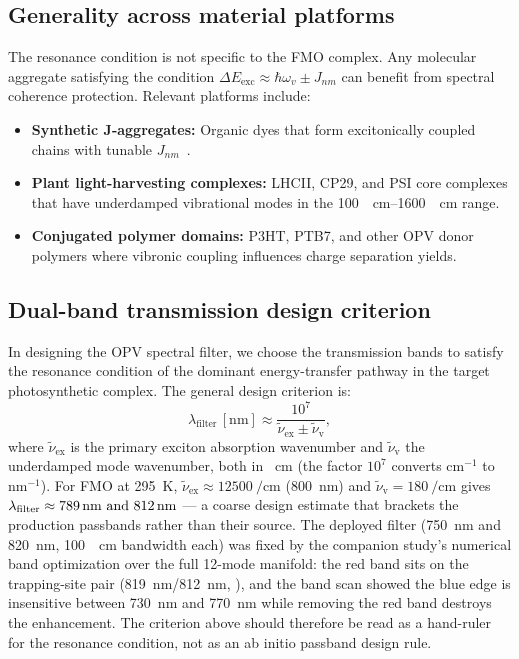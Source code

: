 \documentclass[11pt,a4paper]{article}
\begin{document}
\subsection{Generality across material platforms}

The resonance condition is not specific to the FMO complex. Any molecular aggregate satisfying the condition $\Delta E_{\mathrm{exc}} \approx \hbar\omega_v \pm J_{nm}$ can benefit from spectral coherence protection.
Relevant platforms include:
\begin{itemize}
\item \textbf{Synthetic J-aggregates:} Organic dyes that form excitonically coupled chains with tunable $J_{nm}$~\cite{Jang2008}.
\item \textbf{Plant light-harvesting complexes:} LHCII, CP29, and PSI core complexes that have underdamped vibrational modes in the \qtyrange{100}{1600}{\per\cm} range.
\item \textbf{Conjugated polymer domains:} P3HT, PTB7, and other OPV donor polymers where vibronic coupling influences charge separation yields.
\end{itemize}

\subsection{Dual-band transmission design criterion}

In designing the OPV spectral filter, we choose the transmission bands to satisfy the resonance condition of the dominant energy-transfer pathway in the target photosynthetic complex. The general design criterion is:
\begin{equation}\label{eq:SI_filter_design}
\lambda_{\mathrm{filter}}\,[\mathrm{nm}] \approx \frac{10^{7}}{\tilde\nu_{\mathrm{ex}} \pm \tilde\nu_{\mathrm{v}}},
\end{equation}
where $\tilde\nu_{\mathrm{ex}}$ is the primary exciton absorption wavenumber and $\tilde\nu_{\mathrm{v}}$ the underdamped mode wavenumber, both in \unit{\per\cm} (the factor $10^{7}$ converts cm$^{-1}$ to nm$^{-1}$). For FMO at \qty{295}{\kelvin}, $\tilde\nu_{\mathrm{ex}} \approx \qty{12500}{\per\cm}$ (\qty{800}{\nm}) and $\tilde\nu_{\mathrm{v}} = \qty{180}{\per\cm}$ gives $\lambda_{\mathrm{filter}} \approx \qtylist{789;812}{\nm}$ --- a coarse design estimate that brackets the production passbands rather than their source. The deployed filter (\qty{750}{\nm} and \qty{820}{\nm}, \qty{100}{\per\cm} bandwidth each) was fixed by the companion study's numerical band optimization over the full 12-mode manifold: the red band sits on the trapping-site pair (\qty{819}{\nm}/\qty{812}{\nm}, ), and the band scan showed the blue edge is insensitive between \qty{730}{\nm} and \qty{770}{\nm} while removing the red band destroys the enhancement. The criterion above should therefore be read as a hand-ruler for the resonance condition, not as an ab initio passband design rule.
\end{document}
